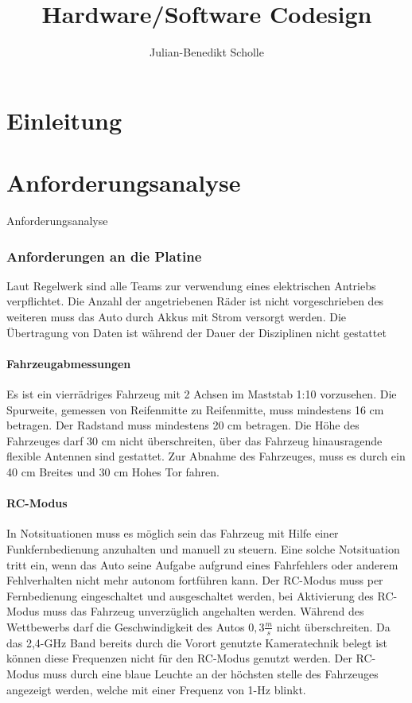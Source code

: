 \documentclass[11pt,twoside,a4paper,openright]{mpreport}
\title{Hardware/Software Codesign}
\author{Julian-Benedikt Scholle}
\begin{document}
\maketitle
\tableofcontents

\chapter{Einleitung}

\chapter{Anforderungsanalyse} Anforderungsanalyse
\subsection{Anforderungen an die Platine}
Laut Regelwerk sind alle Teams zur verwendung eines elektrischen Antriebs verpflichtet.
Die Anzahl der angetriebenen Räder ist nicht vorgeschrieben
des weiteren muss das Auto durch Akkus mit Strom versorgt werden.
Die Übertragung von Daten ist während der Dauer der Disziplinen nicht gestattet

\subsubsection{Fahrzeugabmessungen}
Es ist ein vierrädriges Fahrzeug mit 2 Achsen im Maststab 1:10 vorzusehen. Die Spurweite, gemessen von Reifenmitte zu
Reifenmitte, muss mindestens 16 cm betragen. Der Radstand muss mindestens 20 cm betragen.
Die Höhe des Fahrzeuges darf 30 cm nicht überschreiten, über das Fahrzeug hinausragende flexible Antennen sind gestattet.
Zur Abnahme des Fahrzeuges, muss es durch ein 40 cm Breites und 30 cm Hohes Tor fahren.


\subsubsection{RC-Modus}
In Notsituationen muss es möglich sein das Fahrzeug mit Hilfe einer Funkfernbedienung anzuhalten und manuell zu steuern. Eine solche Notsituation tritt ein, wenn
das Auto seine Aufgabe aufgrund eines Fahrfehlers oder anderem Fehlverhalten nicht mehr autonom fortführen kann.
Der RC-Modus muss per Fernbedienung eingeschaltet und ausgeschaltet werden, bei Aktivierung des RC-Modus muss das Fahrzeug unverzüglich angehalten werden.
Während des Wettbewerbs darf die Geschwindigkeit des Autos $0,3\frac{m}{s}$ nicht überschreiten.
Da das 2,4-GHz Band bereits durch die Vorort genutzte Kameratechnik belegt ist können diese Frequenzen nicht für den RC-Modus genutzt werden.
Der RC-Modus muss durch eine blaue Leuchte an der höchsten stelle des Fahrzeuges angezeigt werden, welche mit einer Frequenz von 1-Hz blinkt.
\end{document}
